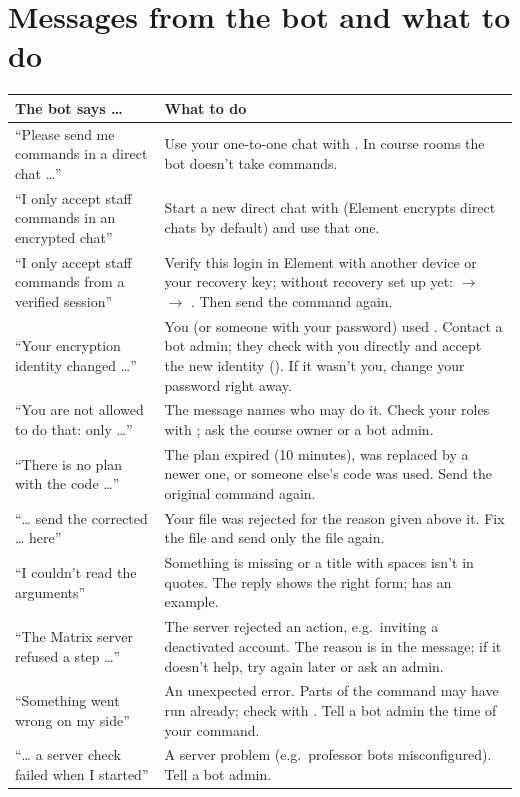 \section{Messages from the bot and what to do}
\label{sec:troubleshooting-messages}

\begin{center}
\begin{tabularx}{\textwidth}{@{}>{\raggedright\arraybackslash}p{5.3cm}L@{}}
\toprule
\textbf{The bot says \dots} & \textbf{What to do} \\
\midrule
\enquote{Please send me commands in a direct chat \dots} &
  Use your one-to-one chat with \botid{}. In course rooms the bot doesn't take commands. \\
\enquote{I only accept staff commands in an encrypted chat} &
  Start a new direct chat with \botid{} (Element encrypts direct chats by default) and use
  that one. \\
\enquote{I only accept staff commands from a verified session} &
  Verify this login in Element with another device or your recovery key; without recovery
  set up yet:  $\rightarrow$  $\rightarrow$ .
  Then send the command again. \\
\enquote{Your encryption identity changed \dots} &
  You (or someone with your password) used . Contact a bot admin; they
  check with you directly and accept the new identity (). If it
  wasn't you, change your password right away. \\
\enquote{You are not allowed to do that: only \dots} &
  The message names who may do it. Check your roles with ; ask the course
  owner or a bot admin. \\
\enquote{There is no plan with the code \dots} &
  The plan expired (10 minutes), was replaced by a newer one, or someone else's code was
  used. Send the original command again. \\
\enquote{\dots{} send the corrected \dots{} here} &
  Your file was rejected for the reason given above it. Fix the file and send only the
  file again. \\
\enquote{I couldn't read the arguments} &
  Something is missing or a title with spaces isn't in quotes. The reply shows the right
  form;  has an example. \\
\enquote{The Matrix server refused a step \dots} &
  The server rejected an action, e.g.\ inviting a deactivated account. The reason is in
  the message; if it doesn't help, try again later or ask an admin. \\
\enquote{Something went wrong on my side} &
  An unexpected error. Parts of the command may have run already; check with
  . Tell a bot admin the time of your command. \\
\enquote{\dots{} a server check failed when I started} &
  A server problem (e.g.\ professor bots misconfigured). Tell a bot admin. \\
\bottomrule
\end{tabularx}
\end{center}

